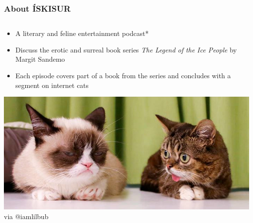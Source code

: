\begin{frame}
    \frametitle{About ÍSKISUR}
    \begin{columns}[T]
        \begin{column}{0.55\textwidth}
            \begin{itemize}
                \item A literary and feline entertainment podcast*
                \item Discuss the erotic and surreal book series \emph{The Legend of the Ice People} by Margit Sandemo
                \item Each episode covers part of a book from the series and concludes with a segment on internet cats
            \end{itemize}
            \vspace{12pt}

            \centering
            \includegraphics[width=.7\textwidth]{../figures/internet-cats}
            \tiny{via @iamlilbub}


\end{column}
\end{columns}
\end{frame}
